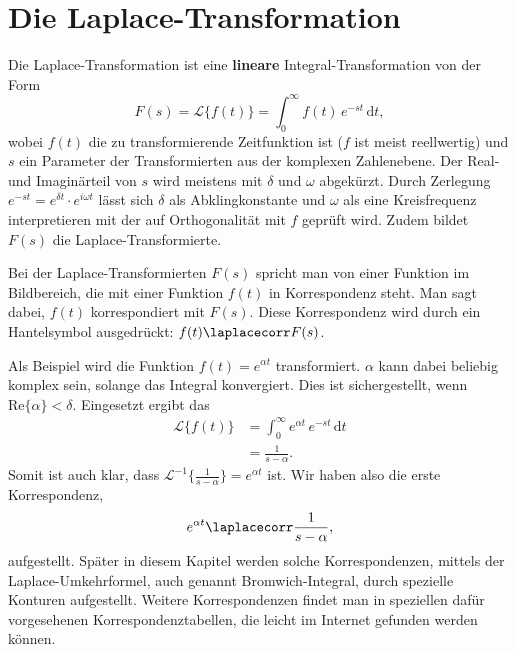 %
%
%
%


\section{Die Laplace-Transformation \label{laplace:section:teil0}}

Die Laplace-Transformation ist eine \textbf{lineare} Integral-Transformation von der Form
\begin{equation}
F(s) = \mathcal{L}\{f(t)\} = \int_{0}^{\infty} f(t) \, e^{-st} \, \mathrm{d}t ,
\end{equation}
wobei $f(t)$ die zu transformierende Zeitfunktion ist ($f$ ist meist reellwertig) und $s$ ein Parameter der Transformierten aus der komplexen Zahlenebene.
Der Real- und Imaginärteil von $s$ wird meistens mit $\delta$ und $\omega$ abgekürzt.
Durch Zerlegung $e^{-st} = e^{\delta t} \cdot e^{i \omega t}$ lässt sich $\delta$ als Abklingkonstante und $\omega$ als eine Kreisfrequenz interpretieren mit der auf Orthogonalität mit $f$ geprüft wird.
Zudem bildet $F(s)$ die Laplace-Transformierte.


Bei der Laplace-Transformierten $F(s)$ spricht man von einer Funktion im Bildbereich, die mit einer Funktion $f(t)$ in Korrespondenz steht.
Man sagt dabei, $f(t)$ korrespondiert mit $F(s)$.
Diese Korrespondenz wird durch ein Hantelsymbol ausgedrückt: $f(t) \laplacecorr F(s)$.


Als Beispiel wird die Funktion $f(t) = e^{\alpha t}$ transformiert.
$\alpha$ kann dabei beliebig komplex sein, solange das Integral konvergiert.
Dies ist sichergestellt, wenn $\mathrm{Re}\{\alpha\} < \delta$.
Eingesetzt ergibt das
\begin{equation}
	\begin{aligned}
		\mathcal{L}\{f(t)\} &= \int_{0}^{\infty} e^{\alpha t} \, e^{-st} \, \mathrm{d}t \\
		&= \frac{1}{s - \alpha}.
	\end{aligned}
	\label{Laplace:teil0:exp beispiel}
\end{equation} 
Somit ist auch klar, dass $\mathcal{L}^{-1}\{\frac{1}{s - \alpha}\} = e^{\alpha t}$ ist.
Wir haben also die erste Korrespondenz,
\begin{equation}
	e^{\alpha t} \laplacecorr \frac{1}{s - \alpha},
	\label{Laplace:teil0:exp korrespondenz}
\end{equation}
aufgestellt.
Später in diesem Kapitel werden solche Korrespondenzen, mittels der Laplace-Umkehrformel, auch genannt Bromwich-Integral, durch spezielle Konturen aufgestellt.
Weitere Korrespondenzen findet man in speziellen dafür vorgesehenen  Korrespondenztabellen, die leicht im Internet gefunden werden können.

